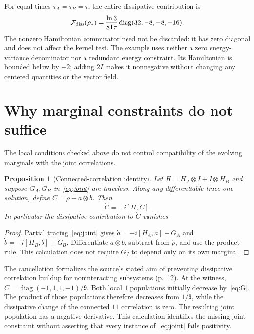 \documentclass[11pt]{article}
\newtheorem{proposition}[theorem]{Proposition}
\newcommand{\diag}{\operatorname{diag}}
\begin{document}
For equal times $\tau_A=\tau_B=\tau$, the entire dissipative contribution is
\begin{equation}
 \mathcal F_{\rm diss}(\rho_*)=\frac{\ln3}{81\tau}\diag(32,-8,-8,-16).\label{eq:diagonal}
\end{equation}
The nonzero Hamiltonian commutator need not be discarded: it has zero diagonal and does not affect the kernel test. The example uses neither a zero energy-variance denominator nor a redundant energy constraint. Its Hamiltonian is bounded below by $-2$; adding $2I$ makes it nonnegative without changing any centered quantities or the vector field.

\section{Why marginal constraints do not suffice}
The local conditions checked above do not control compatibility of the evolving marginals with the joint correlations.
\begin{proposition}[Connected-correlation identity]\label{prop:correlation}
Let $H=H_A\otimes I+I\otimes H_B$ and suppose $G_A,G_B$ in~\eqref{eq:joint} are traceless. Along any differentiable trace-one solution, define $C=\rho-a\otimes b$. Then
\begin{equation}
 \dot C=-i[H,C].\label{eq:correlation}
\end{equation}
In particular the dissipative contribution to $\dot C$ vanishes.
\end{proposition}
\begin{proof}
Partial tracing~\eqref{eq:joint} gives $\dot a=-i[H_A,a]+G_A$ and $\dot b=-i[H_B,b]+G_B$. Differentiate $a\otimes b$, subtract from $\dot\rho$, and use the product rule. This calculation does not require $G_J$ to depend only on its own marginal.
\end{proof}
The cancellation formalizes the source's stated aim of preventing dissipative correlation buildup for noninteracting subsystems (p.~12). At the witness, $C=\diag(-1,1,1,-1)/9$. Both local $1$ populations initially decrease by~\eqref{eq:G}. The product of those populations therefore decreases from $1/9$, while the dissipative change of the connected $11$ correlation is zero. The resulting joint population has a negative derivative. This calculation identifies the missing joint constraint without asserting that every instance of~\eqref{eq:joint} fails positivity.
\end{document}
